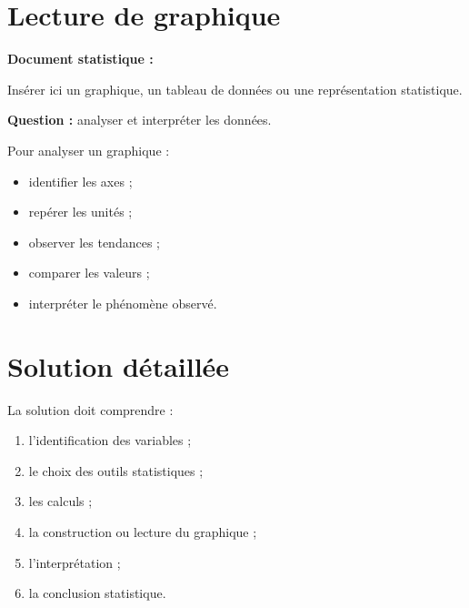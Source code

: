 \documentclass[11pt,a4paper]{article}
\begin{document}
\section{Lecture de graphique}

\begin{cadreenonce}
\textbf{Document statistique :}

Insérer ici un graphique, un tableau de données ou une représentation statistique.

\medskip

\textbf{Question :} analyser et interpréter les données.
\end{cadreenonce}

\begin{cadreaide}
Pour analyser un graphique :
\begin{itemize}
    \item identifier les axes ;
    \item repérer les unités ;
    \item observer les tendances ;
    \item comparer les valeurs ;
    \item interpréter le phénomène observé.
\end{itemize}
\end{cadreaide}

\section{Solution détaillée}

\begin{cadresolution}
La solution doit comprendre :
\begin{enumerate}
    \item l’identification des variables ;
    \item le choix des outils statistiques ;
    \item les calculs ;
    \item la construction ou lecture du graphique ;
    \item l’interprétation ;
    \item la conclusion statistique.
\end{enumerate}
\end{cadresolution}

\end{document}
